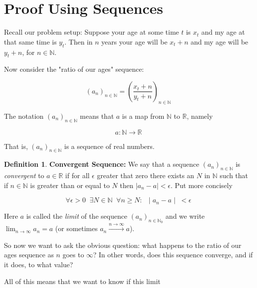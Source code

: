 \documentclass[11pt, oneside]{article}          %
\theoremstyle{definition}
\newtheorem{definition}{Definition}[section]
\begin{document}
\smallskip
\section{Proof Using Sequences}
Recall our problem setup: Suppose your age at some time 
$t$ is $x_t$ and my age at that same time is $y_t$. Then 
in $n$ years your age will be $x_t + n$ and my age will 
be $y_t + n$, for $n \in \mathbb{N}$. 

\bigskip
\noindent
Now consider the "ratio of our ages" sequence:

\medskip
\begin{equation*}
(a_n)_{n \in \mathbb{N}} = \left (\dfrac{x_t +n}{y_t + n}\right )_{n \in \mathbb{N}}
\end{equation*}

\bigskip
\noindent 
The notation $(a_n)_{n \in \mathbb{N}}$ means that $a$ is a map from
$\mathbb{N}$ to $\mathbb{R}$, namely

\begin{equation*}
a: \mathbb{N} \to \mathbb{R}
\end{equation*}

\bigskip
\noindent
That is, $(a_n)_{n \in \mathbb{N}}$ is a sequence of real numbers.

\bigskip
\noindent 
\begin{definition}{\bf Convergent Sequence: }  We say that a sequence 
$(a_n)_{n \in \mathbb{N}}$ is \emph{convergent} to $a \in
\mathbb{R}$ if for all $\epsilon$ greater that zero there exists
an $N$ in $\mathbb{N}$ such that if $n \in \mathbb{N}$ is greater
than or equal to $N$ then $\mid a_n - a \mid < \epsilon$. Put
more concisely

\begin{equation*}
\forall \epsilon > 0 \;\; \exists N \in \mathbb{N} \;\; 
 \forall n \geq N : \;\; \mid a_n - a \mid \; < \epsilon
\end{equation*}

\bigskip
\noindent
Here $a$ is called the \emph{limit} of the sequence $(a_n)_{n \in
\mathbb{N}_{0}}$ and we write ${\displaystyle \lim_{n \to \infty} a_n
= a}$ (or sometimes $a_n \xrightarrow{n \to \infty}{} a$).
\end{definition}


\noindent
So now we want to ask the obvious question: what happens to the
ratio of our ages sequence as $n$ goes to $\infty$? In other
words, does this sequence converge, and if it does, to what
value?

\bigskip
\noindent
All of this means that we want to know if this limit 
\end{document}
